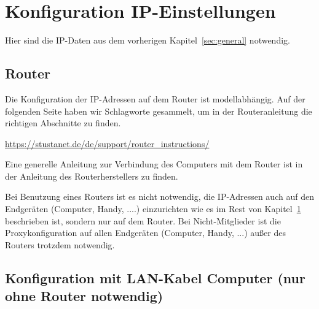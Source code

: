 \documentclass[a4paper,12pt]{scrartcl}
\begin{document}
\newpage

\section{Konfiguration IP-Einstellungen}
\label{sec:network_address}
Hier sind die IP-Daten aus dem vorherigen Kapitel~\ref{sec:general} notwendig.
\subsection{Router}
Die Konfiguration der IP-Adressen auf dem Router ist modellabhängig.
Auf der folgenden Seite haben wir Schlagworte gesammelt, um in der Routeranleitung die richtigen Abschnitte zu finden.

\url{https://stustanet.de/de/support/router_instructions/}

Eine generelle Anleitung zur Verbindung des Computers mit dem Router ist in der Anleitung des Routerherstellers zu finden.

Bei Benutzung eines Routers ist es nicht notwendig, die IP-Adressen auch auf den Endgeräten (Computer, Handy, ....) einzurichten wie es im Rest von Kapitel~\ref{sec:network_address} beschrieben ist, sondern nur auf dem Router.
Bei Nicht-Mitglieder ist die Proxykonfiguration auf allen Endgeräten (Computer, Handy, ...) außer des Routers trotzdem notwendig.

\subsection{Konfiguration mit LAN-Kabel Computer (nur ohne Router notwendig)}
\end{document}
